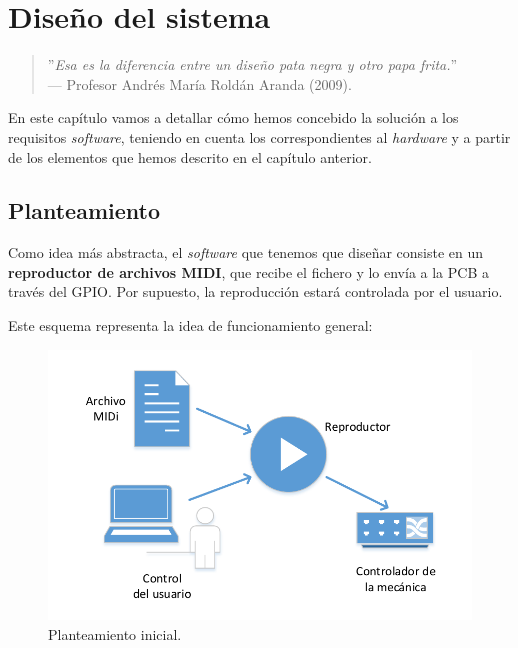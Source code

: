 \chapter{Diseño del sistema}
\label{cap: capitulo_4}

\begin{quote}
	\small \flushright ''\textit{Esa es la diferencia entre un diseño pata negra y otro papa frita.}'' \\
	--- Profesor Andrés María Roldán Aranda (2009).
\end{quote}

\vspace{8em}

En este capítulo vamos a detallar cómo hemos concebido la solución a los requisitos \textit{software}, teniendo en cuenta los correspondientes al \textit{hardware} y a partir de los elementos que hemos descrito en el capítulo anterior.

\newpage

\section{Planteamiento}

Como idea más abstracta, el \textit{software} que tenemos que diseñar consiste en un \textbf{reproductor de archivos \acrshort{MIDI}}, que recibe el fichero y lo envía a la \acrshort{PCB} a través del \acrshort{GPIO}. Por supuesto, la reproducción estará controlada por el usuario.

Este esquema representa la idea de funcionamiento general:

\smallskip

\begin{figure}[H]
	\noindent \begin{centering}
		\includegraphics[width=\linewidth*3/4]{capitulo4/idea}
		\par\end{centering}
	\smallskip
	\caption{\label{fig:idea} Planteamiento inicial.}
\end{figure} 

